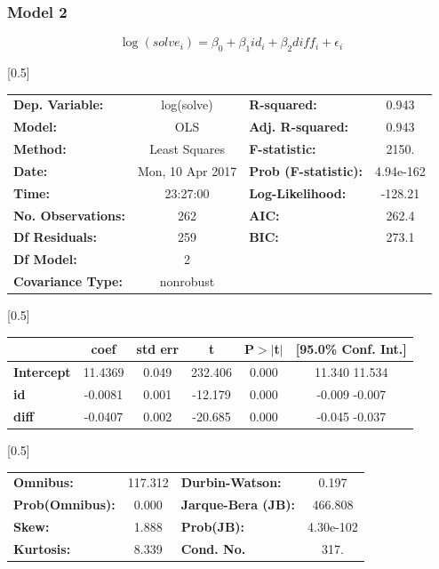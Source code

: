 \documentclass{beamer}
\begin{document}
\begin{frame}

\frametitle{Model 2}

$$
\log(solve_i) = \beta_0 + \beta_1 id_i + \beta_2 diff_i + \epsilon_i
$$

\begin{center}
\scalebox{0.5}[0.5]{
\begin{tabular}{lclc}
\toprule
\textbf{Dep. Variable:}    &    log(solve)    & \textbf{  R-squared:         } &     0.943  \\
\textbf{Model:}            &       OLS        & \textbf{  Adj. R-squared:    } &     0.943  \\
\textbf{Method:}           &  Least Squares   & \textbf{  F-statistic:       } &     2150.  \\
\textbf{Date:}             & Mon, 10 Apr 2017 & \textbf{  Prob (F-statistic):} & 4.94e-162  \\
\textbf{Time:}             &     23:27:00     & \textbf{  Log-Likelihood:    } &   -128.21  \\
\textbf{No. Observations:} &         262      & \textbf{  AIC:               } &     262.4  \\
\textbf{Df Residuals:}     &         259      & \textbf{  BIC:               } &     273.1  \\
\textbf{Df Model:}         &           2      & \textbf{                     } &            \\
\textbf{Covariance Type:}  &    nonrobust     & \textbf{                     } &            \\
\bottomrule
\end{tabular}
}
\scalebox{0.5}[0.5]{
\begin{tabular}{lccccc}
\toprule
                   & \textbf{coef} & \textbf{std err} & \textbf{t} & \textbf{P$>$$|$t$|$} & \textbf{[95.0\% Conf. Int.]}  \\
\midrule
\textbf{Intercept} &      11.4369  &        0.049     &   232.406  &         0.000        &        11.340    11.534       \\
\textbf{id}        &      -0.0081  &        0.001     &   -12.179  &         0.000        &        -0.009    -0.007       \\
\textbf{diff}      &      -0.0407  &        0.002     &   -20.685  &         0.000        &        -0.045    -0.037       \\
\bottomrule
\end{tabular}
}
\scalebox{0.5}[0.5]{
\begin{tabular}{lclc}
\toprule
\textbf{Omnibus:}       & 117.312 & \textbf{  Durbin-Watson:     } &     0.197  \\
\textbf{Prob(Omnibus):} &   0.000 & \textbf{  Jarque-Bera (JB):  } &   466.808  \\
\textbf{Skew:}          &   1.888 & \textbf{  Prob(JB):          } & 4.30e-102  \\
\textbf{Kurtosis:}      &   8.339 & \textbf{  Cond. No.          } &      317.  \\
\bottomrule
\end{tabular}
}
\end{center}


\end{frame}
\end{document}
